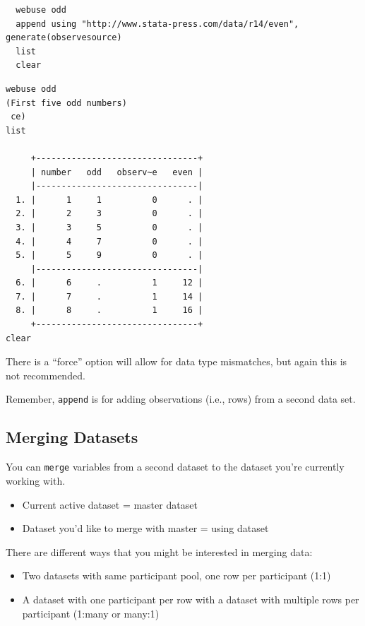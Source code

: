 \documentclass[]{book}
\providecommand{\tightlist}{%
  \setlength{\itemsep}{0pt}\setlength{\parskip}{0pt}}
\begin{document}
\begin{verbatim}
  webuse odd
  append using "http://www.stata-press.com/data/r14/even", generate(observesource)
  list
  clear
\end{verbatim}

\begin{verbatim}
webuse odd
(First five odd numbers)
 ce)
list

     +--------------------------------+
     | number   odd   observ~e   even |
     |--------------------------------|
  1. |      1     1          0      . |
  2. |      2     3          0      . |
  3. |      3     5          0      . |
  4. |      4     7          0      . |
  5. |      5     9          0      . |
     |--------------------------------|
  6. |      6     .          1     12 |
  7. |      7     .          1     14 |
  8. |      8     .          1     16 |
     +--------------------------------+
clear
\end{verbatim}

There is a ``force'' option will allow for data type mismatches, but again this is not recommended.

Remember, \texttt{append} is for adding observations (i.e., rows) from a second data set.

\hypertarget{merging-datasets}{%
\subsection{Merging Datasets}\label{merging-datasets}}

You can \texttt{merge} variables from a second dataset to the dataset you're currently working with.

\begin{itemize}
\tightlist
\item
  Current active dataset = master dataset
\item
  Dataset you'd like to merge with master = using dataset
\end{itemize}

There are different ways that you might be interested in merging data:

\begin{itemize}
\tightlist
\item
  Two datasets with same participant pool, one row per participant (1:1)
\item
  A dataset with one participant per row with a dataset with multiple rows per participant (1:many or many:1)
\end{itemize}
\end{document}
